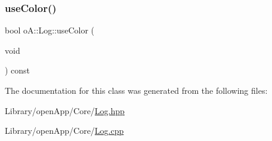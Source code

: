 \mbox{\label{classo_a_1_1_log_a212bf1558c244679cf0e361fc1cf1e9a}} 
\subsubsection{\texorpdfstring{use\+Color()}{useColor()}}
{\footnotesize\ttfamily bool o\+A\+::\+Log\+::use\+Color (\begin{DoxyParamCaption}\item[{void}]{ }\end{DoxyParamCaption}) const\hspace{0.3cm}{\ttfamily [noexcept]}}



The documentation for this class was generated from the following files\+:\begin{DoxyCompactItemize}
\item 
Library/open\+App/\+Core/\mbox{\hyperlink{_log_8hpp}{Log.\+hpp}}\item 
Library/open\+App/\+Core/\mbox{\hyperlink{_log_8cpp}{Log.\+cpp}}\end{DoxyCompactItemize}
